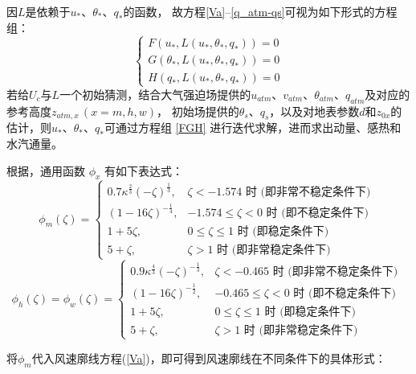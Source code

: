 因$L$是依赖于$u_\ast$、$\theta_\ast$、$q_\ast$的函数，
故方程\eqref{Va}--\eqref{q_atm-qs}可视为如下形式的方程组：
\begin{equation}\label{FGH}
\left\{\begin{array}{l}F\left(u_{*}, L\left(u_{*}, \theta_{*}, q_{*}\right)\right)=0 \\
      G\left(\theta_{*}, L\left(u_{*}, \theta_{*}, q_{*}\right)\right)=0 \\ 
      H\left(q_{*}, L\left(u_{*}, \theta_{*}, q_{*}\right)\right)=0\end{array}\right.
\end{equation}
若给$U_c$与$L$一个初始猜测，结合大气强迫场提供的$u_{atm}$、$v_{atm}$、$\theta_{atm}$、$q_{atm}$及对应的参考高度$z_{atm,x}\, (x=m,h,w)$，
初始场提供的$\theta_s$、$q_s$，以及对地表参数$d$和$z_{0x}$的估计，则$u_\ast$、$\theta_\ast$、$q_\ast$可通过方程组
\eqref{FGH}
进行迭代求解，进而求出动量、感热和水汽通量。

根据\citet{zeng1998intercomparison}，通用函数 $\phi_x$ 有如下表达式：
\begin{equation}\label{phim_zeng}
   \phi_{m}(\zeta)=\begin{cases}
     0.7 \kappa^{\frac{2}{3}}(-\zeta)^{\frac{1}{3}}, & \zeta<-1.574 \text { 时 (即非常不稳定条件下) } \\
     (1-16 \zeta)^{-\frac{1}{4}}, & -1.574 \leq \zeta<0 \text { 时 (即不稳定条件下) } \\
     1+5 \zeta, & 0 \leq \zeta \leq 1 \text { 时 (即稳定条件下) } \\ 
     5+\zeta, & \zeta>1 \text { 时 (即非常稳定条件下) }
   \end{cases}
\end{equation}
\begin{equation}
  \phi_{h}(\zeta)=\phi_{w}(\zeta)=\begin{cases}
     0.9 \kappa^{\frac{4}{3}}(-\zeta)^{-\frac{1}{3}}, & \zeta<-0.465 \text { 时 (即非常不稳定条件下) } \\ 
     (1-16 \zeta)^{-\frac{1}{2}}, & -0.465 \leq \zeta<0 \text { 时 (即不稳定条件下) } \\ 
     1+5 \zeta, & 0 \leq \zeta \leq 1 \text { 时 (即稳定条件下) } \\
     5+\zeta, & \zeta>1 \text { 时 (即非常稳定条件下) }
   \end{cases}
\end{equation}

将$\phi_m$代入风速廓线方程(\ref{Va})，即可得到风速廓线在不同条件下的具体形式：

